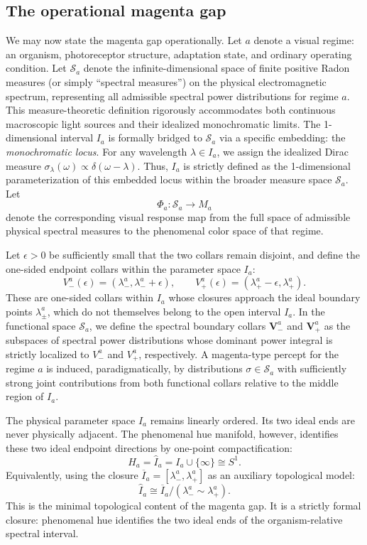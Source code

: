 \documentclass[preprint,12pt,authoryear]{elsarticle}
\theoremstyle{plain}
\theoremstyle{definition}
\theoremstyle{remark}
\begin{document}
\subsection{The operational magenta gap}
\label{subsec:operational-magenta-gap}

\noindent We may now state the magenta gap operationally. Let $a$ denote a visual regime: an organism, photoreceptor structure, adaptation state, and ordinary operating condition. Let $\mathcal{S}_a$ denote the infinite-dimensional space of finite positive Radon measures (or simply ``spectral measures'') on the physical electromagnetic spectrum, representing all admissible spectral power distributions for regime $a$. This measure-theoretic definition rigorously accommodates both continuous macroscopic light sources and their idealized monochromatic limits. The 1-dimensional interval $I_a$ is formally bridged to $\mathcal{S}_a$ via a specific embedding: the \emph{monochromatic locus}. For any wavelength $\lambda \in I_a$, we assign the idealized Dirac measure $\sigma_\lambda(\omega) \propto \delta(\omega - \lambda)$. Thus, $I_a$ is strictly defined as the 1-dimensional parameterization of this embedded locus within the broader measure space $\mathcal{S}_a$. Let
\[
\Phi_{a}:\mathcal{S}_{a}\longrightarrow M_{a}
\]
denote the corresponding visual response map from the full space of admissible physical spectral measures to the phenomenal color space of that regime.

Let $\epsilon>0$ be sufficiently small that the two collars remain disjoint, and define the one-sided endpoint collars within the parameter space $I_a$:
$$
V_-^{a}(\epsilon)=(\lambda_-^{a},\lambda_-^{a}+\epsilon),
\qquad
V_+^{a}(\epsilon)=(\lambda_+^{a}-\epsilon,\lambda_+^{a}).
$$
These are one-sided collars within $I_a$ whose closures approach the ideal boundary points $\lambda_\pm^a$, which do not themselves belong to the open interval $I_a$. In the functional space $\mathcal{S}_a$, we define the spectral boundary collars $\mathbf{V}_-^a$ and $\mathbf{V}_+^a$ as the subspaces of spectral power distributions whose dominant power integral is strictly localized to $V_-^{a}$ and $V_+^{a}$, respectively. A magenta-type percept for the regime $a$ is induced, paradigmatically, by distributions $\sigma \in \mathcal{S}_a$ with sufficiently strong joint contributions from both functional collars relative to the middle region of $I_a$.

The physical parameter space $I_a$ remains linearly ordered. Its two ideal ends are never physically adjacent. The phenomenal hue manifold, however, identifies these two ideal endpoint directions by one-point compactification:
$$
H_a=\widehat{I}_a=I_a\cup\{\infty\}\cong S^1.
$$
Equivalently, using the closure $\overline I_a=[\lambda_-^a,\lambda_+^a]$ as an auxiliary topological model:
$$
\widehat{I}_a\cong \overline I_a/(\lambda_-^a\sim\lambda_+^a).
$$
This is the minimal topological content of the magenta gap. It is a strictly formal closure: phenomenal hue identifies the two ideal ends of the organism-relative spectral interval.
\end{document}
